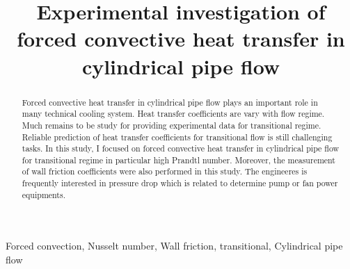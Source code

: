 \documentclass[conference]{IEEEtran}
\begin{document}
\title{Experimental investigation of forced convective heat transfer in cylindrical pipe flow\\
}

\author{
}

\maketitle

\begin{abstract}
Forced convective heat transfer in cylindrical pipe flow plays an important role in many technical cooling system.
Heat transfer coefficients are vary with flow regime.
Much remains to be study for providing experimental data for transitional regime.
Reliable prediction of heat transfer coefficients for transitional flow is still challenging tasks.
In this study, I focused on forced convective heat transfer in cylindrical pipe flow for transitional regime in particular high Prandtl number.
Moreover, the measurement of wall friction coefficients were also performed in this study.
The engineeres is frequently interested in pressure drop which is related to determine pump or fan power equipments.

\end{abstract}

\begin{IEEEkeywords}
Forced convection, Nusselt number, Wall friction, transitional, Cylindrical pipe flow
\end{IEEEkeywords}
\end{document}
